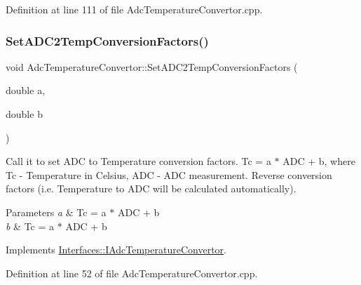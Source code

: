 Definition at line 111 of file Adc\+Temperature\+Convertor.\+cpp.

\mbox{\label{class_adc_temperature_convertor_a4850843e55992608213cc9cf82d36830}} 
\subsubsection{\texorpdfstring{Set\+A\+D\+C2\+Temp\+Conversion\+Factors()}{SetADC2TempConversionFactors()}}
{\footnotesize\ttfamily void Adc\+Temperature\+Convertor\+::\+Set\+A\+D\+C2\+Temp\+Conversion\+Factors (\begin{DoxyParamCaption}\item[{double}]{a,  }\item[{double}]{b }\end{DoxyParamCaption})\hspace{0.3cm}{\ttfamily [virtual]}}



Call it to set A\+DC to Temperature conversion factors. Tc = a $\ast$ A\+DC + b, where Tc -\/ Temperature in Celsius, A\+DC -\/ A\+DC measurement. Reverse conversion factors (i.\+e. Temperature to A\+DC will be calculated automatically). 


\begin{DoxyParams}{Parameters}
{\em a} & Tc = a $\ast$ A\+DC + b \\
\hline
{\em b} & Tc = a $\ast$ A\+DC + b \\
\hline
\end{DoxyParams}


Implements \hyperlink{class_interfaces_1_1_i_adc_temperature_convertor_a3e4c9204b3593bc434a041c7a69c430f}{Interfaces\+::\+I\+Adc\+Temperature\+Convertor}.



Definition at line 52 of file Adc\+Temperature\+Convertor.\+cpp.

\mbox{\label{class_adc_temperature_convertor_a56103443d7da4769339ddb685a0a8df0}} 
